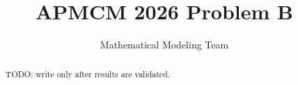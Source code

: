 \documentclass[11pt]{ctexart}
\begin{document}
\title{APMCM 2026 Problem B}
\author{Mathematical Modeling Team}
\date{}
\maketitle
\begin{abstract}TODO: write only after results are validated.\end{abstract}









\end{document}
